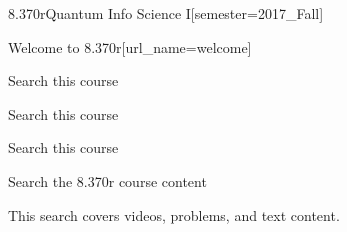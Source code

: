 \documentclass[12pt]{article}
\begin{document}
\begin{edXcourse}{8.370r}{Quantum Info Science I}[semester=2017_Fall]


\begin{edXchapter}{Welcome to 8.370r}[url_name=welcome]



% 
% 
% 
% 
% 



\begin{edXsection}{Search this course}



  \begin{edXvertical}{Search this course}

    \begin{edXtext}{Search this course}

      {\Large Search the 8.370r course content}


      This search covers videos, problems, and text content.


    \end{edXtext}

  \end{edXvertical}


\end{edXsection}


\end{edXchapter}

\end{edXcourse}

\end{document}
